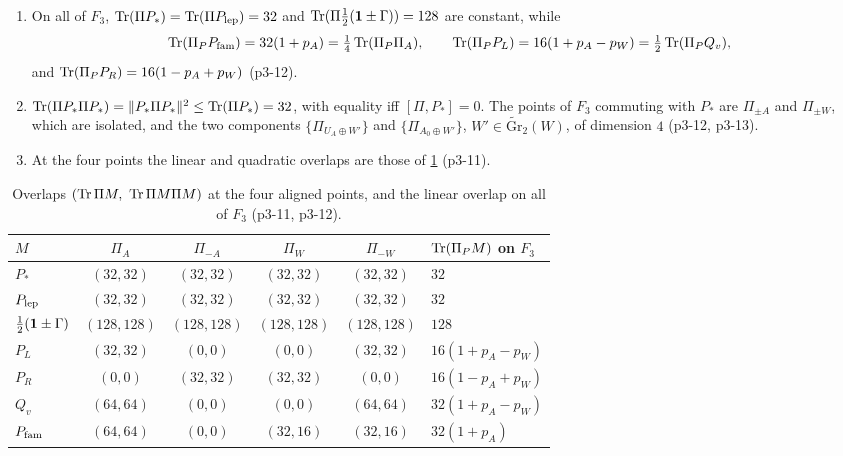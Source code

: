 \begin{proposition}
\label{p3:prop:overlaps}
\begin{enumerate}[label=(\roman*),leftmargin=2.2em]
\item On all of $F_3$, $\operatorname{Tr}(\Pi P_*)=\operatorname{Tr}(\Pi P_{\rm lep})=32$ and $\operatorname{Tr}(\Pi\tfrac12(\mathbf 1\pm\Gamma))=128$ are constant, while
\[
\operatorname{Tr}(\Pi_PP_{\rm fam})=32(1+p_A)=\tfrac14\operatorname{Tr}(\Pi_P\Pi_A),\qquad \operatorname{Tr}(\Pi_PP_L)=16(1+p_A-p_W)=\tfrac12\operatorname{Tr}(\Pi_PQ_v),
\]
and $\operatorname{Tr}(\Pi_PP_R)=16(1-p_A+p_W)$ (p3-12).
\item $\operatorname{Tr}(\Pi P_*\Pi P_*)=\|P_*\Pi P_*\|^2\le\operatorname{Tr}(\Pi P_*)=32$, with equality iff $[\Pi,P_*]=0$. The points of $F_3$ commuting with $P_*$ are $\Pi_{\pm A}$ and $\Pi_{\pm W}$,
which are isolated, and the two components $\{\Pi_{U_A\oplus W'}\}$ and $\{\Pi_{A_0\oplus W'}\}$, $W'\in\widetilde{\mathrm{Gr}}_2(W)$, of dimension $4$ (p3-12, p3-13).
\item At the four points the linear and quadratic overlaps are those of \cref{p3:tab:overlaps} (p3-11).
\end{enumerate}
\end{proposition}

\begin{table}[t]
\centering
\small
\begin{tabular}{@{}lccccl@{}}
\toprule
$M$ & $\Pi_A$ & $\Pi_{-A}$ & $\Pi_W$ & $\Pi_{-W}$ & $\operatorname{Tr}(\Pi_PM)$ on $F_3$\\
\midrule
$P_*$ & $(32,32)$ & $(32,32)$ & $(32,32)$ & $(32,32)$ & $32$\\
$P_{\rm lep}$ & $(32,32)$ & $(32,32)$ & $(32,32)$ & $(32,32)$ & $32$\\
$\tfrac12(\mathbf 1\pm\Gamma)$ & $(128,128)$ & $(128,128)$ & $(128,128)$ & $(128,128)$ & $128$\\
$P_L$ & $(32,32)$ & $(0,0)$ & $(0,0)$ & $(32,32)$ & $16(1+p_A-p_W)$\\
$P_R$ & $(0,0)$ & $(32,32)$ & $(32,32)$ & $(0,0)$ & $16(1-p_A+p_W)$\\
$Q_v$ & $(64,64)$ & $(0,0)$ & $(0,0)$ & $(64,64)$ & $32(1+p_A-p_W)$\\
$P_{\rm fam}$ & $(64,64)$ & $(0,0)$ & $(32,16)$ & $(32,16)$ & $32(1+p_A)$\\
\bottomrule
\end{tabular}
\caption{Overlaps $(\operatorname{Tr}\Pi M,\ \operatorname{Tr}\Pi M\Pi M)$ at the four aligned points, and the linear overlap on all of $F_3$ (p3-11, p3-12).}
\label{p3:tab:overlaps}
\end{table}

